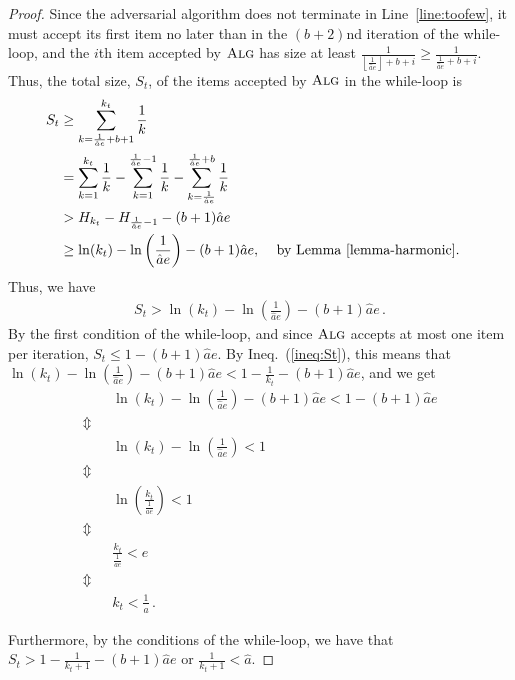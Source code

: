 \documentclass[a4paper,UKenglish,cleveref, autoref, thm-restate]{lipics-v2021}
\newcommand{\ALG}{\ensuremath{\operatorname{\textsc{Alg}}}\xspace}
\newcommand{\FLOOR}[1]{\left\lfloor#1\right\rfloor}
\newcommand{\guess}{\ensuremath{\hat{a}}\xspace}
\newcommand{\kfinal}{\ensuremath{k_t}\xspace}
\begin{document}
\begin{proof}
Since the adversarial algorithm does not terminate in
Line~\ref{line:toofew},
it must accept its first item no later than in the $(b+2)$nd iteration
of the while-loop, and
the $i$th item accepted by \ALG has size at least
$\frac{1}{\FLOOR{\frac{1}{\guess e}}+b+i} \geq \frac{1}{\frac{1}{\guess e}+b+i}$.
Thus, the total size, $S_t$, of the items accepted by \ALG in the while-loop
is
\begin{alignat*}{2}
  S_t & \geq \sum_{k=\frac{1}{\guess e}+b+1}^{\kfinal} \frac{1}{k}\\
  & =  \sum_{k=1}^{\kfinal} \frac{1}{k}-
       \sum_{k=1}^{\frac{1}{\guess e}-1} \frac{1}{k}-
       \sum_{k=\frac{1}{\guess e}}^{\frac{1}{\guess e}+b} \frac{1}{k}  \\
  & > H_{\kfinal} - H_{\frac{1}{\guess e}-1} - (b+1)\guess e\\
  & \geq \ln(\kfinal) - \ln\left(\frac{1}{\guess e} \right) - (b+1)\guess e,
  && \text{ by Lemma~\ref{lemma-harmonic}.}
\end{alignat*}
Thus, we have
\begin{align}
  \label{ineq:St}
  S_t > \ln(\kfinal) - \ln\left(\frac{1}{\guess e} \right) - (b+1)\guess e\,.
\end{align}
By the first condition of the while-loop, and since \ALG accepts at
most one item per iteration, $S_t \leq 1-(b+1)\guess e$.
By Ineq.~(\ref{ineq:St}), this means that $\ln(\kfinal) -
\ln\left(\frac{1}{\guess e} \right) - (b+1)\guess e <
1-\frac{1}{\kfinal}-(b+1)\guess e$, and we get
\begin{align}
& \ln(\kfinal) -\ln\left(\frac{1}{\guess e} \right) - (b+1)\guess e <
1-(b+1)\guess e\nonumber\\
\Updownarrow~~~\nonumber\\
& \ln(\kfinal) -\ln\left(\frac{1}{\guess e} \right) < 1\nonumber\\
\Updownarrow~~~\nonumber\\
& \ln \left( \frac{\kfinal}{\frac{1}{\guess e}} \right) < 1\nonumber\\
\Updownarrow~~~\nonumber\\
& \frac{\kfinal}{\frac{1}{\guess e}} < e\nonumber\\
\Updownarrow~~~\nonumber\\
& \kfinal < \frac{1}{\guess} \label{ineq:ktupper} \,.
\end{align}


Furthermore, by the conditions of the while-loop, we have that 
$S_t > 1-\frac{1}{\kfinal+1} - (b+1)\guess e$ or
$\frac{1}{\kfinal+1} < \guess$.


\end{proof}
\end{document}

